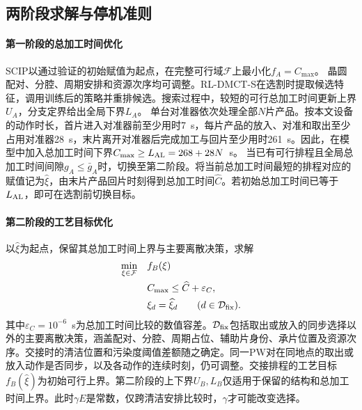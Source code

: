 \documentclass[preprint,12pt,nonatbib]{elsarticle}
\begin{document}
\subsection{两阶段求解与停机准则}
\label{sec:two-stage-stop-cn}

\paragraph{第一阶段的总加工时间优化}
SCIP以通过验证的初始赋值为起点，在完整可行域$\mathcal F$上最小化$f_A=C_{\max}$。
晶圆配对、分腔、周期安排和资源次序均可调整。RL-DMCT-S在选割时提取候选特征，调用训练后的策略并重排候选。搜索过程中，较短的可行总加工时间更新上界$U_A$，分支定界给出全局下界$L_A$。
单台对准器依次处理全部$N$片产品。按本文设备的动作时长，首片进入对准器前至少用时7~s，每片产品的放入、对准和取出至少占用对准器28~s，末片离开对准器后完成加工与回片至少用时261~s。因此，在模型中加入总加工时间下界$C_{\max}\ge L_{\rm AL}=268+28N$~s。
当已有可行排程且全局总加工时间间隙$g_A\le\bar g_A$时，切换至第二阶段。将当前总加工时间最短的排程对应的赋值记为$\widehat\xi$，由末片产品回片时刻得到总加工时间$\widehat C$。若初始总加工时间已等于$L_{\rm AL}$，即可在选割前切换目标。

\paragraph{第二阶段的工艺目标优化}
以$\widehat\xi$为起点，保留其总加工时间上界与主要离散决策，求解
\begin{equation}
\begin{aligned}
\min_{\xi\in\mathcal F}\quad & f_B(\xi)\\
\text{}\quad & C_{\max}\le\widehat C+\varepsilon_C,\\
&\xi_d=\widehat\xi_d\qquad(d\in\mathcal D_{\rm fix}).
\end{aligned}
\label{eq:secondary-domain-cn}
\end{equation}
其中$\varepsilon_C=10^{-6}$~s为总加工时间比较的数值容差。$\mathcal D_{\rm fix}$包括取出或放入的同步选择以外的主要离散决策，涵盖配对、分腔、周期占位、辅助片身份、承片位置及资源次序。交接时的清洁位置和污染度阈值差额随之确定。同一PW对在同地点的取出或放入动作是否同步，以及各动作的连续时刻，仍可调整。交接排程的工艺目标$f_B(\widehat\xi)$为初始可行上界。第二阶段的上下界$U_B,L_B$仅适用于保留的结构和总加工时间上界。此时$\gamma E$是常数，仅跨清洁安排比较时，$\gamma$才可能改变选择。
\end{document}

